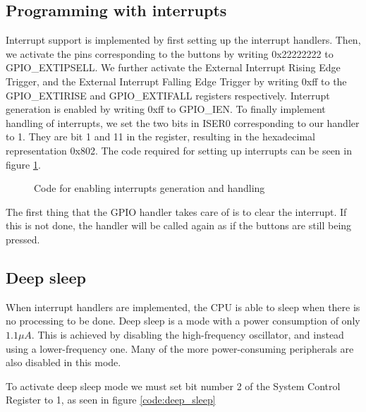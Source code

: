\subsection{Programming with interrupts}
\label{subsec:dev_pros_interrupts}

Interrupt support is implemented by first setting up the interrupt handlers.
Then, we activate the pins corresponding to the buttons by writing 0x22222222 to GPIO\_EXTIPSELL.
We further activate the External Interrupt Rising Edge Trigger, and the External Interrupt Falling Edge Trigger by writing 0xff to the GPIO\_EXTIRISE and GPIO\_EXTIFALL registers respectively.
Interrupt generation is enabled by writing 0xff to GPIO\_IEN.
To finally implement handling of interrupts, we set the two bits in ISER0 corresponding to our handler to 1. They are bit 1 and 11 in the register, resulting in the hexadecimal representation 0x802.
The code required for setting up interrupts can be seen in figure \ref{code:interrupt_setup}.

\begin{figure}[h!]
\caption{Code for enabling interrupts generation and handling}
\label{code:interrupt_setup}
\end{figure}


The first thing that the GPIO handler takes care of is to clear the interrupt. If this is not done, the handler will be called again as if the buttons are still being pressed.

\subsection{Deep sleep}
\label{subsec:dev_pros_deep_sleep}

When interrupt handlers are implemented, the CPU is able to sleep when there is no processing to be done.
Deep sleep is a mode with a power consumption of only $1.1 \mu A$.
This is achieved by disabling the high-frequency oscillator, and instead using a lower-frequency one.
Many of the more power-consuming peripherals are also disabled in this mode.

To activate deep sleep mode we must set bit number 2 of the System Control Register to 1, as seen in figure \ref{code:deep_sleep}

